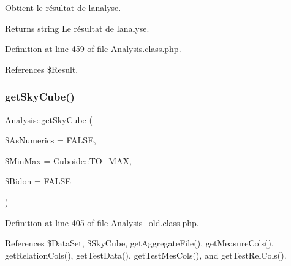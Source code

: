 Obtient le résultat de l\textquotesingle{}analyse. \begin{DoxyReturn}{Returns}
string Le résultat de l\textquotesingle{}analyse. 
\end{DoxyReturn}


Definition at line 459 of file Analysis.\+class.\+php.



References \$\+Result.

\mbox{\label{class_analysis_aad6affe3bbce3e477cf3b33933f492d1}} 
\subsubsection{\texorpdfstring{get\+Sky\+Cube()}{getSkyCube()}\hspace{0.1cm}{\footnotesize\ttfamily [1/2]}}
{\footnotesize\ttfamily Analysis\+::get\+Sky\+Cube (\begin{DoxyParamCaption}\item[{}]{\$\+As\+Numerics = {\ttfamily FALSE},  }\item[{}]{\$\+Min\+Max = {\ttfamily \hyperlink{class_cuboide_afd49ea48fafb0362d27f78f6f4ef8b84}{Cuboide\+::\+T\+O\+\_\+\+M\+AX}},  }\item[{}]{\$\+Bidon = {\ttfamily FALSE} }\end{DoxyParamCaption})}



Definition at line 405 of file Analysis\+\_\+old.\+class.\+php.



References \$\+Data\+Set, \$\+Sky\+Cube, get\+Aggregate\+File(), get\+Measure\+Cols(), get\+Relation\+Cols(), get\+Test\+Data(), get\+Test\+Mes\+Cols(), and get\+Test\+Rel\+Cols().

